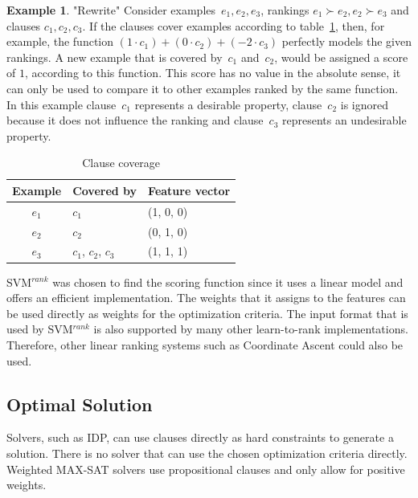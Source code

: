 \documentclass[letterpaper]{article}
\newcommand{\svm}{SVM$^{rank}$}
\theoremstyle{definition}
\newtheorem{example}{Example}
\begin{document}
\begin{example} "Rewrite"
  Consider examples~$e_1, e_2, e_3$, rankings $e_1 \succ e_2, e_2 \succ e_3$ and clauses $c_1, c_2, c_3$.
  If the clauses cover examples according to table~\ref{tbl:cover_examples}, then, for example, the function $(1 \cdot c_1) + (0\cdot c_2) + (-2\cdot c_3)$ perfectly models the given rankings.
  A new example that is covered by~$c_1$ and~$c_2$, would be assigned a score of $1$, according to this function.
  This score has no value in the absolute sense, it can only be used to compare it to other examples ranked by the same function.
  In this example clause~$c_1$ represents a desirable property, clause~$c_2$ is ignored because it does not influence the ranking and clause~$c_3$ represents an undesirable property.

  \begin{table}
  \caption{Clause coverage}
  \label{tbl:cover_examples}
  \begin{tabularx}{\linewidth}{c|l|X}
    \textbf{Example} & \textbf{Covered by} & \textbf{Feature vector}\\
    \toprule
    $e_1$             & $c_1$               & (1, 0, 0) \\
    $e_2$             & $c_2$               & (0, 1, 0) \\
    $e_3$             & $c_1$, $c_2$, $c_3$ & (1, 1, 1) \\
  \end{tabularx}
  \end{table}
\end{example}

\svm{} \cite{joachims2006training} was chosen to find the scoring function since it uses a linear model and offers an efficient implementation.
The weights that it assigns to the features can be used directly as weights for the optimization criteria.
The input format that is used by \svm{} is also supported by many other learn-to-rank implementations.
Therefore, other linear ranking systems such as Coordinate Ascent \cite{metzler2007linear} could also be used.

\subsection{Optimal Solution}
Solvers, such as IDP, can use clauses directly as hard constraints to generate a solution.
There is no solver that can use the chosen optimization criteria directly.
Weighted MAX-SAT solvers use propositional clauses and only allow for positive weights.
\end{document}
